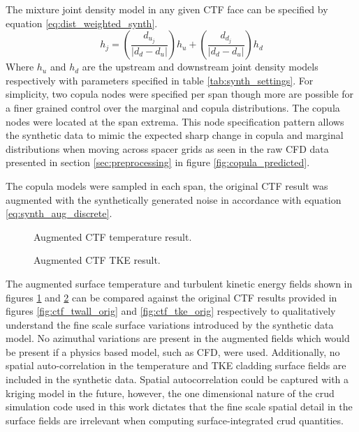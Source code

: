 The mixture joint density model in any given CTF face can be specified by equation \ref{eq:dist_weighted_synth}.
\begin{equation}
    h_j = \left( \frac{d_{u_j}}{|d_{d} - d_{u}|} \right) h_u +
    \left( \frac{d_{d_j}}{|d_{d} - d_{u}|} \right) h_d
    \label{eq:dist_weighted_synth}
\end{equation}
Where $h_u$ and $h_d$ are the upstream and downstream joint density models respectively with parameters specified in table \ref{tab:synth_settings}.
For simplicity, two copula nodes were specified per span though more are possible for a finer grained control over the marginal and copula distributions.    The copula nodes were located at the span extrema. This node specification pattern allows the synthetic data to mimic the expected sharp change in copula and marginal distributions when moving across spacer grids as seen in the raw CFD data presented in section \ref{sec:preprocessing} in figure \ref{fig:copula_predicted}.

The copula models were sampled in each span, the original CTF result was augmented with the synthetically generated noise in accordance with equation \ref{eq:synth_aug_discrete}.

\begin{figure}[H]%
    \centering
    \qquad
    \caption[Augmented CFD result.]{Augmented CTF temperature result.}%
    \label{fig:ctf_twall_aug}%
\end{figure}

\begin{figure}[H]%
    \centering
    \qquad
    \caption[Augmented CFD TKE result.]{Augmented CTF TKE result.}%
    \label{fig:ctf_tke_aug}%
\end{figure}

The augmented surface temperature and turbulent kinetic energy fields shown in figures \ref{fig:ctf_twall_aug} and \ref{fig:ctf_tke_aug} can be compared against the original CTF results provided in figures \ref{fig:ctf_twall_orig} and \ref{fig:ctf_tke_orig} respectively to qualitatively understand the fine scale surface variations introduced by the synthetic data model.  No azimuthal variations are present in the augmented fields which would be present if a physics based model, such as CFD, were used.  Additionally, no spatial auto-correlation in the temperature and TKE cladding surface fields are included in the synthetic data.  Spatial autocorrelation could be captured with a kriging model in the future, however, the one dimensional nature of the crud simulation code used in this work dictates that the fine scale spatial detail in the surface fields are irrelevant when computing surface-integrated crud quantities.


